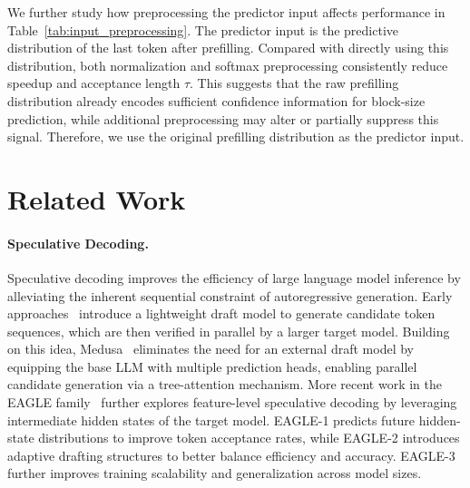\documentclass{article}
\begin{document}
We further study how preprocessing the predictor input affects performance in Table~\ref{tab:input_preprocessing}. The predictor input is the predictive distribution of the last token after prefilling. Compared with directly using this distribution, both normalization and softmax preprocessing consistently reduce speedup and acceptance length $\tau$. This suggests that the raw prefilling distribution already encodes sufficient confidence information for block-size prediction, while additional preprocessing may alter or partially suppress this signal. Therefore, we use the original prefilling distribution as the predictor input.



\section{Related Work}
\paragraph{Speculative Decoding.}
Speculative decoding improves the efficiency of large language model inference by alleviating the inherent sequential constraint of autoregressive generation. Early approaches~\cite{leviathan2023fastinferencetransformersspeculative} introduce a lightweight draft model to generate candidate token sequences, which are then verified in parallel by a larger target model. Building on this idea, Medusa~\cite{cai2024medusasimplellminference} eliminates the need for an external draft model by equipping the base LLM with multiple prediction heads, enabling parallel candidate generation via a tree-attention mechanism. More recent work in the EAGLE family~\cite{li2025eaglespeculativesamplingrequires,li2024eagle2fasterinferencelanguage,li2025eagle3scalinginferenceacceleration} further explores feature-level speculative decoding by leveraging intermediate hidden states of the target model. EAGLE-1 predicts future hidden-state distributions to improve token acceptance rates, while EAGLE-2 introduces adaptive drafting structures to better balance efficiency and accuracy. EAGLE-3 further improves training scalability and generalization across model sizes.
\end{document}
